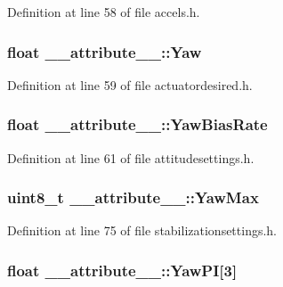 \-Definition at line 58 of file accels.\-h.

\hypertarget{struct____attribute_____ad6cda9d8bdf2a88c79d62ef012c4447e}{
\subsubsection[{\-Yaw}]{\setlength{\rightskip}{0pt plus 5cm}float {\bf \-\_\-\-\_\-attribute\-\_\-\-\_\-\-::\-Yaw}}}\label{struct____attribute_____ad6cda9d8bdf2a88c79d62ef012c4447e}


\-Definition at line 59 of file actuatordesired.\-h.

\hypertarget{struct____attribute_____abe69aa6e76067d6be2fb7ba24fd94501}{
\subsubsection[{\-Yaw\-Bias\-Rate}]{\setlength{\rightskip}{0pt plus 5cm}float {\bf \-\_\-\-\_\-attribute\-\_\-\-\_\-\-::\-Yaw\-Bias\-Rate}}}\label{struct____attribute_____abe69aa6e76067d6be2fb7ba24fd94501}


\-Definition at line 61 of file attitudesettings.\-h.

\hypertarget{struct____attribute_____a2c9d35e2b1179bec9675a380651e573f}{
\subsubsection[{\-Yaw\-Max}]{\setlength{\rightskip}{0pt plus 5cm}uint8\-\_\-t {\bf \-\_\-\-\_\-attribute\-\_\-\-\_\-\-::\-Yaw\-Max}}}\label{struct____attribute_____a2c9d35e2b1179bec9675a380651e573f}


\-Definition at line 75 of file stabilizationsettings.\-h.

\hypertarget{struct____attribute_____a119faeca3be62c42089e3de95a3a9228}{
\subsubsection[{\-Yaw\-P\-I}]{\setlength{\rightskip}{0pt plus 5cm}float {\bf \-\_\-\-\_\-attribute\-\_\-\-\_\-\-::\-Yaw\-P\-I}\mbox{[}3\mbox{]}}}\label{struct____attribute_____a119faeca3be62c42089e3de95a3a9228}


